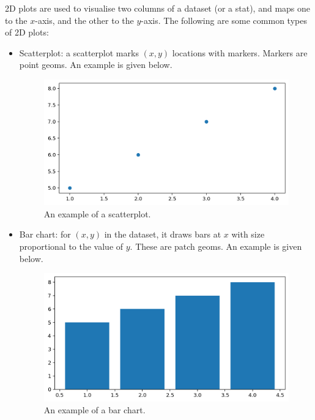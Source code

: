 \documentclass[a4paper, openany]{memoir}
\begin{document}
2D plots are used to visualise two columns of a dataset (or a stat), and maps one to the $x$-axis, and the other to the $y$-axis. The following are some common types of 2D plots:
\begin{itemize}
    \item Scatterplot: a scatterplot marks $(x, y)$ locations with markers. Markers are point geoms. An example is given below.
    \begin{figure}[H]
        \centering
        \includegraphics[scale=0.4]{src/2.5 scatterplot example.png}
        \caption{An example of a scatterplot.}
    \end{figure}

    \item Bar chart: for $(x, y)$ in the dataset, it draws bars at $x$ with size proportional to the value of $y$. These are patch geoms. An example is given below.
    \begin{figure}[H]
        \centering
        \includegraphics[scale=0.4]{src/2.6 bar chart example.png}
        \caption{An example of a bar chart.}
    \end{figure}


\end{itemize}
\end{document}
